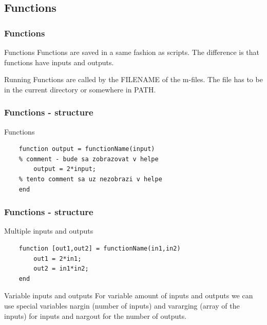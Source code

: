 \documentclass{beamer}
\begin{document}
\subsection{Functions}

\begin{frame}
\frametitle{Functions}
  \begin{block}{Functions}
  Functions are saved in a same fashion as scripts. The difference is that functions have inputs and outputs.
  \end{block}
  
  \pause
  
  \begin{block}{Running}
  Functions are called by the FILENAME of the m-files. The file has to be in the current directory or somewhere in PATH.
  \end{block}
  
\end{frame}

\begin{frame}[fragile]
\frametitle{Functions - structure}
  \begin{block}{Functions}
  \begin{verbatim}
    function output = functionName(input)
    % comment - bude sa zobrazovat v helpe
        output = 2*input;
    % tento comment sa uz nezobrazi v helpe
    end \end{verbatim}
  \end{block}
  
\end{frame}

\begin{frame}[fragile]
\frametitle{Functions - structure}
  
  \begin{block}{Multiple inputs and outputs}
  \begin{verbatim}
    function [out1,out2] = functionName(in1,in2)
        out1 = 2*in1;
        out2 = in1*in2;
    end \end{verbatim}
  \end{block}

  \begin{block}{Variable inputs and outputs}
  For variable amount of inputs and outputs we can use special variables nargin (number of inputs) and vararging (array of the inputs) for inputs and nargout for the number of outputs.

  \end{block}
\end{frame}
\end{document}
